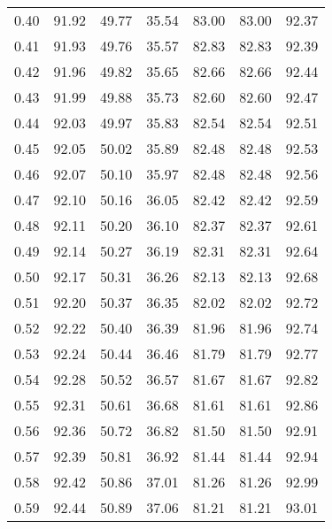 \begin{tabular}{|c|c|c|c|c|c|c|}
      0.40 &     91.92 &     49.77 &      35.54 &   83.00 &      83.00 &         92.37 \\
      0.41 &     91.93 &     49.76 &      35.57 &   82.83 &      82.83 &         92.39 \\
      0.42 &     91.96 &     49.82 &      35.65 &   82.66 &      82.66 &         92.44 \\
      0.43 &     91.99 &     49.88 &      35.73 &   82.60 &      82.60 &         92.47 \\
      0.44 &     92.03 &     49.97 &      35.83 &   82.54 &      82.54 &         92.51 \\
      0.45 &     92.05 &     50.02 &      35.89 &   82.48 &      82.48 &         92.53 \\
      0.46 &     92.07 &     50.10 &      35.97 &   82.48 &      82.48 &         92.56 \\
      0.47 &     92.10 &     50.16 &      36.05 &   82.42 &      82.42 &         92.59 \\
      0.48 &     92.11 &     50.20 &      36.10 &   82.37 &      82.37 &         92.61 \\
      0.49 &     92.14 &     50.27 &      36.19 &   82.31 &      82.31 &         92.64 \\
      0.50 &     92.17 &     50.31 &      36.26 &   82.13 &      82.13 &         92.68 \\
      0.51 &     92.20 &     50.37 &      36.35 &   82.02 &      82.02 &         92.72 \\
      0.52 &     92.22 &     50.40 &      36.39 &   81.96 &      81.96 &         92.74 \\
      0.53 &     92.24 &     50.44 &      36.46 &   81.79 &      81.79 &         92.77 \\
      0.54 &     92.28 &     50.52 &      36.57 &   81.67 &      81.67 &         92.82 \\
      0.55 &     92.31 &     50.61 &      36.68 &   81.61 &      81.61 &         92.86 \\
      0.56 &     92.36 &     50.72 &      36.82 &   81.50 &      81.50 &         92.91 \\
      0.57 &     92.39 &     50.81 &      36.92 &   81.44 &      81.44 &         92.94 \\
      0.58 &     92.42 &     50.86 &      37.01 &   81.26 &      81.26 &         92.99 \\
      0.59 &     92.44 &     50.89 &      37.06 &   81.21 &      81.21 &         93.01 \\

\end{tabular}
